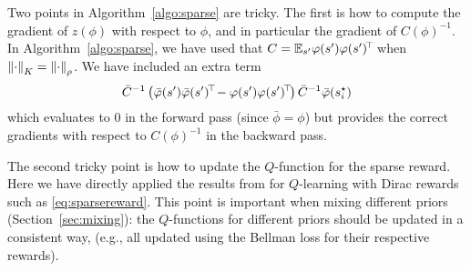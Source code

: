\documentclass[11pt,a4paper]{article}
\begin{document}
Two points in Algorithm~\ref{algo:sparse} are tricky. The first is how to compute the
gradient of $z(\phi)$ with respect to $\phi$, and in particular the
gradient of $C(\phi)^{-1}$. In Algorithm~\ref{algo:sparse}, we have used
that $C=\mathbb{E}_{s'} \varphi(s')\varphi(s')^{\!\top}\!$ when
$\left\lVert\cdot\right\rVert_K=\left\lVert\cdot\right\rVert_\rho$. We have included an extra term
\begin{equation}
\bar C^{-1}
    \left(\bar{\varphi}(s')\bar{\varphi}(s')^{\!\top}\!-\varphi(s')\varphi(s')^{\!\top}\!\right)\bar
    C^{-1}\bar {\varphi}(s^\star_i)
\end{equation}
which evaluates to $0$ in the forward pass (since $\bar\phi=\phi$) but
provides the correct gradients with respect to $C(\phi)^{-1}$ in the backward pass.

The second tricky point is how to update the $Q$-function for the sparse
reward. Here we have directly applied the results from
\cite{blier2021unbiased} for $Q$-learning with Dirac rewards such as
\eqref{eq:sparsereward}. This point
is important when mixing different priors (Section~\ref{sec:mixing}): the
$Q$-functions for different priors should be updated in a consistent way,
(e.g., all updated using the Bellman loss for their respective rewards).
\end{document}
